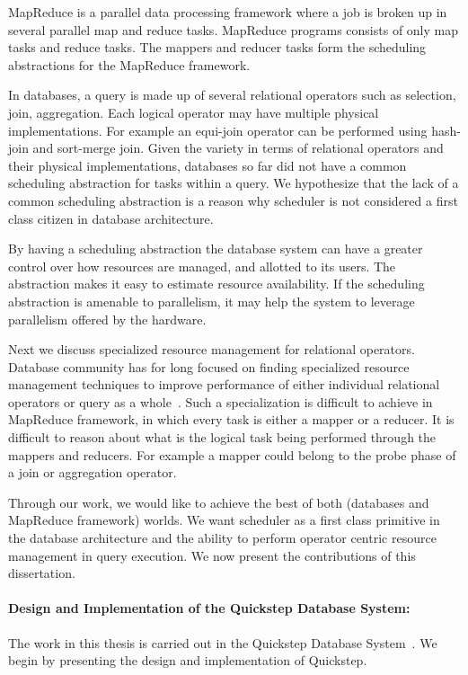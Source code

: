 MapReduce is a parallel data processing framework where a job is broken up in several parallel map and reduce tasks. 
MapReduce programs consists of only map tasks and reduce tasks.
The mappers and reducer tasks form the scheduling abstractions for the MapReduce framework.

In databases, a query is made up of several relational operators such as selection, join, aggregation. 
Each logical operator may have multiple physical implementations. 
For example an equi-join operator can be performed using hash-join and sort-merge join.
Given the variety in terms of relational operators and their physical implementations, databases so far did not have a common scheduling abstraction for tasks within a query. 
We hypothesize that the lack of a common scheduling abstraction is a reason why scheduler is not considered a first class citizen in database architecture.

By having a scheduling abstraction the database system can have a greater control over how resources are managed, and allotted to its users.
The abstraction makes it easy to estimate resource availability.
If the scheduling abstraction is amenable to parallelism, it may help the system to leverage parallelism offered by the hardware. 

Next we discuss specialized resource management for relational operators. 
Database community has for long focused on finding specialized resource management techniques to improve performance of either individual relational operators or query as a whole~\cite{davison1995dynamic, Bouganim:1998:MSL:288627.288646, memory-hash-ibm, mehta1993dynamic, DBLP:conf/cikm/NagD98}.
Such a specialization is difficult to achieve in MapReduce framework, in which every task is either a mapper or a reducer.
It is difficult to reason about what is the logical task being performed through the mappers and reducers. 
For example a mapper could belong to the probe phase of a join or aggregation operator. 

Through our work, we would like to achieve the best of both (databases and MapReduce framework) worlds.
We want scheduler as a first class primitive in the database architecture and the ability to perform operator centric resource management in query execution. 
We now present the contributions of this dissertation. 

\paragraph{Design and Implementation of the Quickstep Database System:}
The work in this thesis is carried out in the Quickstep Database System~\cite{Quickstep-website, patel1quickstep, quickstep-system}.
We begin by presenting the design and implementation of Quickstep.

